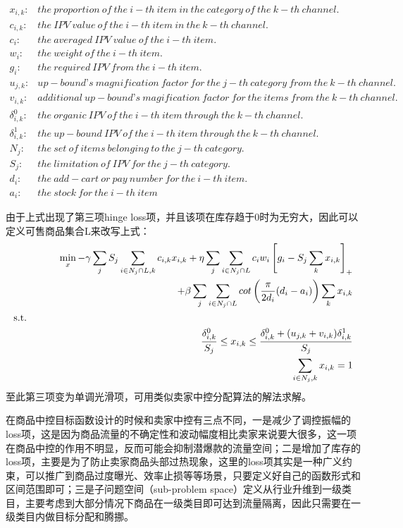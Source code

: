 \begin{align}
x_{i,k}: &the\ proportion\ of\ the\ i-th\ item\ in\ the\ category\ of\ the\ k-th\ channel. \\
c_{i,k}: &the\ IPV\ value\ of\ the\ i-th\ item\ in\ the\ k-th\ channel. \\
c_i: &the\ averaged\ IPV\ value\ of\ the\ i-th\ item. \\
w_i: &the\ weight\ of\ the\ i-th\ item. \\
g_i: &the\ required\ IPV\ from\ the\ i-th\ item. \\
u_{j,k}: &up-bound’s\ magnification\ factor\ for\ the\ j-th\ category\ from\ the\ k-th\ channel. \\
v_{i,k}: &additional\ up-bound’s\ magification\ factor\ for\ the\ items\ from\ the\ k-th\ channel. \\
\delta_{i,k}^0: &the\ organic\ IPV\ of\ the\ i-th\ item\ through\ the\ k-th\ channel. \\
\delta_{i,k}^1: &the\ up-bound\ IPV\ of\ the\ i-th\ item\ through\ the\ k-th\ channel. \\
N_j: &the\ set\ of\ items\ belonging\ to\ the\ j-th\ category. \\
S_j: &the\ limitation\ of\ IPV\ for\ the\ j-th\ category. \\
d_i: &the\ add-cart\ or\ pay\ number\ for\ the\ i-th\ item. \\
a_i: &the\ stock\ for\ the\ i-th\ item
\end{align}


由于上式出现了第三项hinge loss项，并且该项在库存趋于0时为无穷大，因此可以定义可售商品集合L来改写上式：
\begin{align}
\min_x - \gamma \sum_jS_j \sum_{i\in N_j\cap L,k} c_{i,k} x_{i,k}  + \eta \sum_j \sum_{i\in N_j\cap L} c_i w_i  \left [g_i - S_j \sum_k x_{i,k} \right]_{+} \\
+ \beta \sum_j \sum_{i \in N_j\cap L} cot \left ( \frac{\pi}{2d_i}(d_i-a_i)\right )\sum_k x_{i,k} \\
\leftline{s.t. }\\
\frac{\delta_{i,k}^{0}}{S_j} \leq x_{i,k} \leq \frac{\delta_{i,k}^0 + (u_{j,k} + v_{i,k}) \delta_{i,k}^1}{S_j} \\
\sum_{i \in N_j,k} x_{i,k}=1 
\end{align}
至此第三项变为单调光滑项，可用类似卖家中控分配算法的解法求解。

在商品中控目标函数设计的时候和卖家中控有三点不同，一是减少了调控振幅的loss项，这是因为商品流量的不确定性和波动幅度相比卖家来说要大很多，这一项在商品中控的作用不明显，反而可能会抑制潜爆款的流量空间；二是增加了库存的loss项，主要是为了防止卖家商品头部过热现象，这里的loss项其实是一种广义约束，可以推广到商品过度曝光、效率止损等等场景，只要定义好自己的函数形式和区间范围即可；三是子问题空间（sub-problem space）定义从行业升维到一级类目，主要考虑到大部分情况下商品在一级类目即可达到流量隔离，因此只需要在一级类目内做目标分配和腾挪。

